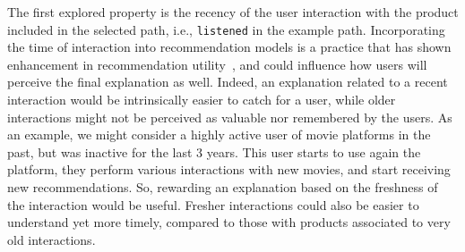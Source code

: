 \documentclass[sigconf]{acmart}
\begin{document}
\vspace{1mm}  
The first explored property is the recency of the user interaction with the product included in the selected path, i.e.,  \texttt{listened}  in the example path. 
Incorporating the time of interaction into recommendation models is a practice that has shown enhancement in recommendation utility~\cite{LeePP08,DingLO06}, and could influence how users will perceive the final explanation as well.
Indeed, an explanation related to a recent interaction would be intrinsically easier to catch for a user, while older interactions might not be perceived as valuable nor remembered by the users.
As an example, we might consider a highly active user of movie platforms in the past, but was inactive for the last 3 years. 
This user starts to use again the platform, they perform various interactions with new movies, and start receiving new recommendations. 
So, rewarding an explanation based on the freshness of the interaction would be useful. 
Fresher interactions could also be easier to understand yet more timely, compared to those with products associated to very old interactions.
\end{document}
